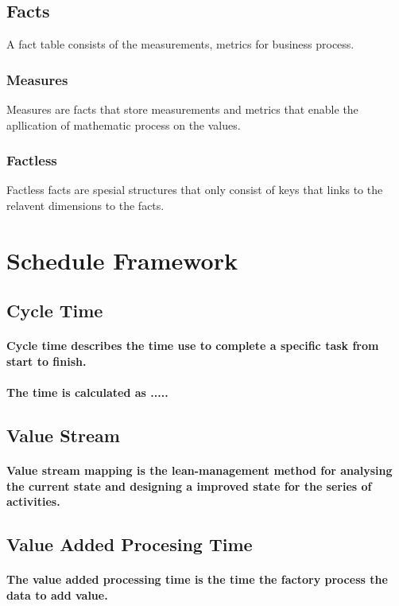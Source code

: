 \documentclass{acm_proc_article-sp}
\begin{document}
\subsection{Facts}
A fact table consists of the measurements, metrics for business process. 
\subsubsection{Measures}
Measures are facts that store measurements and metrics that enable the apllication of mathematic process on the values. 
\subsubsection{Factless}
Factless facts are spesial structures that only consist of keys that links to the relavent dimensions to the facts.
\pagebreak
\section{Schedule Framework}
\subsection{Cycle Time}
\paragraph{Cycle time describes the time use to complete a specific task from start to finish.}
\paragraph{The time is calculated as .....}
\subsection{Value Stream}
\paragraph{Value stream mapping is the lean-management method for analysing the current state and designing a improved state for the series of activities.}
\subsection{Value Added Procesing Time}
\paragraph{The value added processing time is the time the factory process the data to add value.}
\end{document}
